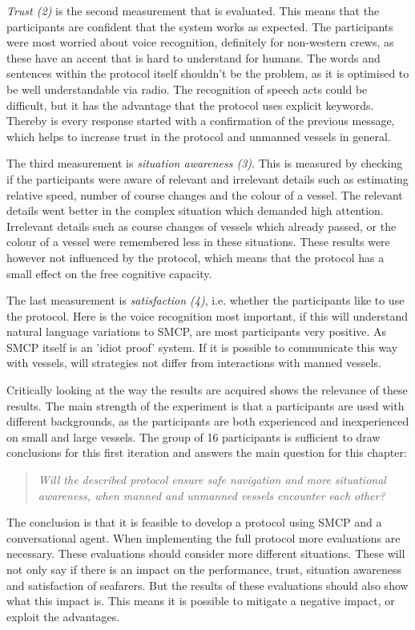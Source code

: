 \emph{Trust (2)} is the second measurement that is evaluated. This means that the participants are confident that the system works as expected. The participants were most worried about voice recognition, definitely for non-western crews, as these have an accent that is hard to understand for humans. The words and sentences within the protocol itself shouldn't be the problem, as it is optimised to be well understandable via radio. The recognition of speech acts could be difficult, but it has the advantage that the protocol uses explicit keywords. Thereby is every response started with a confirmation of the previous message, which helps to increase trust in the protocol and unmanned vessels in general.

The third measurement is \emph{situation awareness (3)}. This is measured by checking if the participants were aware of relevant and irrelevant details such as estimating relative speed, number of course changes and the colour of a vessel. The relevant details went better in the complex situation which demanded high attention. Irrelevant details such as course changes of vessels which already passed, or the colour of a vessel were remembered less in these situations. These results were however not influenced by the protocol, which means that the protocol has a small effect on the free cognitive capacity.

The last measurement is \emph{satisfaction (4)}, i.e. whether the participants like to use the protocol. Here is the voice recognition most important, if this will understand natural language variations to \ac{SMCP}, are most participants very positive. As \ac{SMCP} itself is an 'idiot proof' system. If it is possible to communicate this way with vessels, will strategies not differ from interactions with manned vessels.

Critically looking at the way the results are acquired shows the relevance of these results. The main strength of the experiment is that a participants are used with different backgrounds, as the participants are both experienced and inexperienced on small and large vessels. The group of 16 participants is sufficient to draw conclusions for this first iteration and answers the main question for this chapter:
\begin{quotation}
	\emph{Will the described protocol ensure safe navigation and more situational awareness, when manned and unmanned vessels encounter each other?}
\end{quotation}

The conclusion is that it is feasible to develop a protocol using SMCP and a conversational agent.
When implementing the full protocol more evaluations are necessary. These evaluations should consider more different situations. These will not only say if there is an impact on the performance, trust, situation awareness and satisfaction of seafarers. But the results of these evaluations should also show what this impact is. This means it is possible to mitigate a negative impact, or exploit the advantages.
